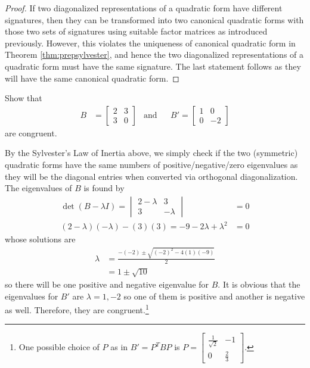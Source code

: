 \begin{proof}
If two diagonalized representations of a quadratic form have different signatures, then they can be transformed into two canonical quadratic forms with those two sets of signatures using suitable factor matrices as introduced previously. However, this violates the uniqueness of canonical quadratic form in Theorem \ref{thm:prepsylvester}, and hence the two diagonalized representations of a quadratic form must have the same signature. The last statement follows as they will have the same canonical quadratic form.
\end{proof}

\begin{exmp}
Show that
\begin{align*}
B &= \begin{bmatrix}
2 & 3 \\
3 & 0
\end{bmatrix}
& \text{and} & 
& B' = 
\begin{bmatrix}
1 & 0 \\
0 & -2
\end{bmatrix}
\end{align*}
are congruent.
\end{exmp}
\begin{solution}
By the Sylvester's Law of Inertia above, we simply check if the two (symmetric) quadratic forms have the same numbers of positive/negative/zero eigenvalues as they will be the diagonal entries when converted via orthogonal diagonalization. The eigenvalues of $B$ is found by
\begin{align*}
\det(B - \lambda I) = 
\begin{vmatrix}
2 - \lambda & 3 \\
3 & - \lambda
\end{vmatrix} &= 0 \\
(2-\lambda)(-\lambda) - (3)(3) = -9 - 2\lambda + \lambda^2 &= 0
\end{align*}
whose solutions are 
\begin{align*}
\lambda &= \frac{-(-2) \pm \sqrt{(-2)^2 - 4(1)(-9)}}{2} \\
&= 1 \pm \sqrt{10}
\end{align*}
so there will be one positive and negative eigenvalue for $B$. It is obvious that the eigenvalues for $B'$ are $\lambda = 1, -2$ so one of them is positive and another is negative as well. Therefore, they are congruent.\footnote{One possible choice of $P$ as in $B' = P^TBP$ is $P = 
\begin{bmatrix}
\frac{1}{\sqrt{2}}&-1\\ 
0&\frac{2}{3}
\end{bmatrix}$.}
\end{solution}



